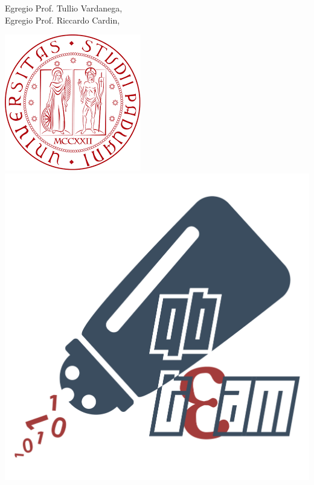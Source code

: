 \documentclass[12pt]{letter}
\begin{document}
    \begin{letter}
        { Egregio Prof. Tullio Vardanega,\\Egregio Prof. Riccardo Cardin,}
        \begin{center}
            \includegraphics[scale=0.5]{../Template/Immagini/logoUnipd.png}
            \includegraphics[scale=0.095]{../Template/Immagini/qbteam.png}
        \end{center}
        {
            
}
\end{letter}
\end{document}
